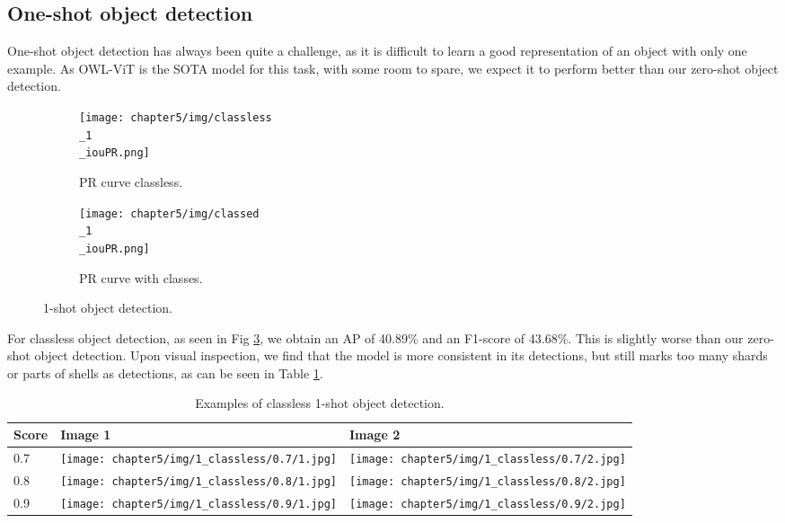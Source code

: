 \subsection*{One-shot object detection}
One-shot object detection has always been quite a challenge, as it is difficult to learn a good representation of an object with only one example. As OWL-ViT is the SOTA model for this task, with some room to spare, we expect it to perform better than our zero-shot object detection. 

\begin{figure}[h]
    \begin{adjustwidth}{-0.5in}{-0.5in}
        \centering
        \begin{subfigure}[b]{0.4\pdfpagewidth}
            \texttt{[image: chapter5/img/classless\\\_1\\\_iouPR.png]}
            \caption{PR curve classless.}
            \label{fig:5_n_shot_classless_pr_curve}
        \end{subfigure}
        \hfill
        \begin{subfigure}[b]{0.4\pdfpagewidth}
            \texttt{[image: chapter5/img/classed\\\_1\\\_iouPR.png]}
            \caption{PR curve with classes.}
            \label{fig:5_n_shot_classed}
        \end{subfigure}
    \end{adjustwidth}
    \caption{1-shot object detection.}
    \label{fig:5_1_shot}
\end{figure}

For classless object detection, as seen in Fig \ref{fig:5_1_shot}, we obtain an AP of 40.89\% and an F1-score of 43.68\%. This is slightly worse than our zero-shot object detection. Upon visual inspection, we find that the model is more consistent in its detections, but still marks too many shards or parts of shells as detections, as can be seen in Table \ref{fig:5_n_shot_classless_examples}.

\begin{table}[H]
    \centering
    \captionsetup{justification=centering}
    \begin{tabular}{|l|ll|}
        \hline
        Score & Image 1 & Image 2 \\ \hline
        0.7 & \texttt{[image: chapter5/img/1\_classless/0.7/1.jpg]} & \texttt{[image: chapter5/img/1\_classless/0.7/2.jpg]} \\ \hline
        0.8 & \texttt{[image: chapter5/img/1\_classless/0.8/1.jpg]} & \texttt{[image: chapter5/img/1\_classless/0.8/2.jpg]} \\ \hline
        0.9 & \texttt{[image: chapter5/img/1\_classless/0.9/1.jpg]} & \texttt{[image: chapter5/img/1\_classless/0.9/2.jpg]} \\ \hline
    \end{tabular}
    \caption{Examples of classless 1-shot object detection.}
    \label{fig:5_n_shot_classless_examples}
\end{table}

